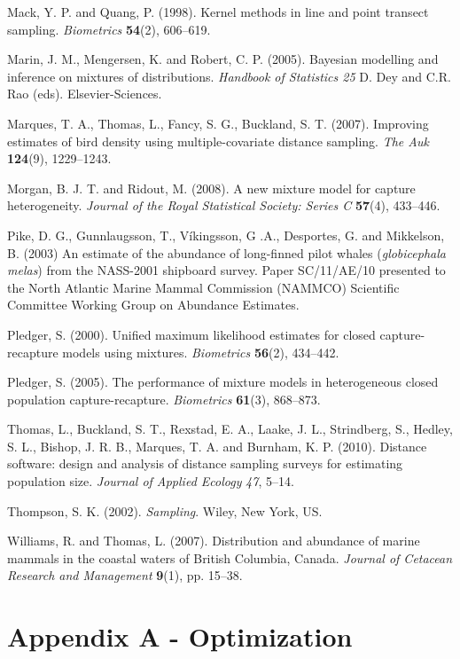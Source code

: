 \documentclass[useAMS,referee, usegraphicx]{biom}
\begin{document}
\begin{thebibliography}{}
\bibitem{ } Mack, Y. P. and Quang, P. (1998). Kernel methods in line and point transect sampling. \textit{Biometrics} \textbf{54}(2), 606--619. 

\bibitem{ } Marin, J. M., Mengersen, K. and Robert, C. P. (2005). Bayesian modelling and inference on mixtures of distributions. \textit{Handbook of Statistics 25} D. Dey and C.R. Rao (eds). Elsevier-Sciences.

\bibitem{ } Marques, T. A., Thomas, L., Fancy, S. G., Buckland, S. T. (2007). Improving estimates of bird density using multiple-covariate distance sampling. \textit{The Auk} \textbf{124}(9), 1229--1243.

\bibitem{ } Morgan, B. J. T. and Ridout, M. (2008). A new mixture model for capture heterogeneity. \textit{Journal of the Royal Statistical Society: Series C} \textbf{57}(4), 433--446. 

\bibitem{ } Pike, D. G., Gunnlaugsson, T., V\'{i}kingsson, G .A., Desportes, G. and Mikkelson, B.  (2003) An estimate of the abundance of long-finned pilot whales (\textit{globicephala melas}) from the NASS-2001 shipboard survey. Paper SC/11/AE/10 presented to the North Atlantic Marine Mammal Commission (NAMMCO) Scientific Committee Working Group on Abundance Estimates.

\bibitem{ } Pledger, S. (2000). Unified maximum likelihood estimates for closed capture-recapture models using mixtures. \textit{Biometrics} \textbf{56}(2), 434--442. 

\bibitem{ } Pledger, S. (2005). The performance of mixture models in heterogeneous closed population capture-recapture. \textit{Biometrics} \textbf{61}(3), 868--873.

\bibitem{ } Thomas, L., Buckland, S. T., Rexstad, E. A., Laake, J. L., Strindberg, S., Hedley, S. L., Bishop, J. R. B., Marques, T. A. and Burnham, K. P. (2010). Distance software: design and analysis of distance sampling surveys for estimating population size. \textit{Journal of Applied Ecology} \textit{47}, 5--14.

\bibitem{ } Thompson, S. K. (2002). \textit{Sampling}. Wiley, New York, US.

\bibitem{ } Williams, R. and Thomas, L. (2007). Distribution and abundance of marine mammals in the coastal waters of British Columbia, Canada. \textit{Journal of Cetacean Research and Management} \textbf{9}(1), pp. 15--38.

\end{thebibliography}


\section*{Appendix A - Optimization}
\label{s:optimization}
\end{document}
